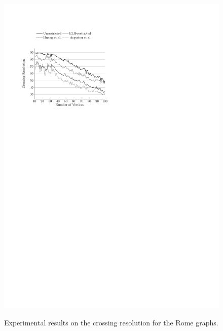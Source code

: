 \documentclass{comjnl}
\begin{document}
\begin{figure}[t]
{	\includegraphics[scale=0.99,page=4]{figures/rome}}
	\caption{Experimental results on the crossing resolution for the Rome graphs.}
	\label{fig:cr-res}
\end{figure}
\end{document}
